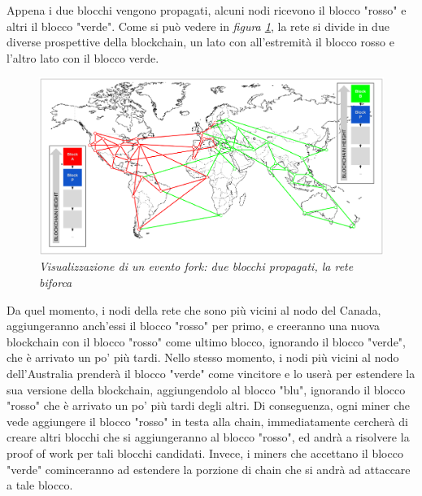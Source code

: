 Appena i due blocchi vengono propagati, alcuni nodi ricevono il blocco "rosso" e altri il blocco "verde". Come si può vedere in \textit{figura \ref{fig:fork3}}, la rete si divide in due diverse prospettive della blockchain, un lato con all'estremità il blocco rosso e l'altro lato con il blocco verde.
\begin{figure}[htbp]
	\centering
	\includegraphics[width=0.85 \linewidth]{figure/fork3}
	\caption{\textit{Visualizzazione di un evento fork: due blocchi propagati, la rete biforca} \label{fig:fork3}}
\end{figure}

Da quel momento, i nodi della rete che sono più vicini al nodo del Canada, aggiungeranno anch'essi il blocco "rosso" per primo, e creeranno una nuova blockchain con il blocco "rosso" come ultimo blocco, ignorando il blocco "verde", che è arrivato un po' più tardi. Nello stesso momento, i nodi più vicini al nodo dell'Australia prenderà il blocco "verde" come vincitore e lo userà per estendere la sua versione della blockchain, aggiungendolo al blocco "blu", ignorando il blocco "rosso" che è arrivato un po' più tardi degli altri. Di conseguenza, ogni miner che vede aggiungere il blocco "rosso" in testa alla chain, immediatamente cercherà di creare altri blocchi che si aggiungeranno al blocco "rosso", ed andrà a risolvere la proof of work per tali blocchi candidati. Invece, i miners che accettano il blocco "verde" cominceranno ad estendere la porzione di chain che si andrà ad attaccare a tale blocco.


